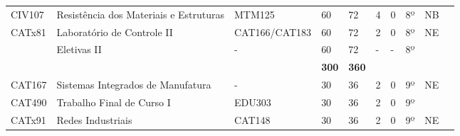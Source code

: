 \begin{table}[]
{\begin{tabular}{l|l|l|l|l|l|l|l|l|l}
			\multicolumn{1}{|l|}{CIV107}                        & Resistência dos Materiais e Estruturas                   & MTM125                        & 60                                                           & 72                         & 4                        & 0                         & 8º                         & NB                      &  \\ \cline{1-9}
			\multicolumn{1}{|l|}{CATx81}                        & Laboratório de Controle II                               & CAT166/CAT183                 & 60                                                           & 72                         & 2                        & 0                         & 8º                         & NE                      &  \\ \cline{1-9}
			\multicolumn{1}{|l|}{}                              & {\color[HTML]{009901} Eletivas II}                       & {\color[HTML]{009901} -}      & {\color[HTML]{009901} 60}                                    & {\color[HTML]{009901} 72}  & {\color[HTML]{009901} -} & {\color[HTML]{009901} -}  & {\color[HTML]{009901} 8º}  & {\color[HTML]{009901} } &  \\ \cline{1-9}
			\multicolumn{1}{|l|}{}                              &                                                          &                               & \textbf{300}                                                 & \textbf{360}               &                          &                           &                            &                         &  \\ \cline{1-9}
			\multicolumn{1}{|l|}{CAT167}                        & Sistemas Integrados de Manufatura                        & -                             & 30                                                           & 36                         & 2                        & 0                         & 9º                         & NE                      &  \\ \cline{1-9}
			\multicolumn{1}{|l|}{{\color[HTML]{3531FF} CAT490}} & {\color[HTML]{3531FF} Trabalho Final de Curso I}         & {\color[HTML]{3531FF} EDU303} & {\color[HTML]{3531FF} 30}                                    & {\color[HTML]{3531FF} 36}  & {\color[HTML]{3531FF} 2} & {\color[HTML]{3531FF} 0}  & {\color[HTML]{3531FF} 9º}  & {\color[HTML]{3531FF} } &  \\ \cline{1-9}
			\multicolumn{1}{|l|}{CATx91}                        & Redes Industriais                                        & CAT148                        & 30                                                           & 36                         & 2                        & 0                         & 9º                         & NE                      &  \\ \cline{1-9}

\end{tabular}}
\end{table}
